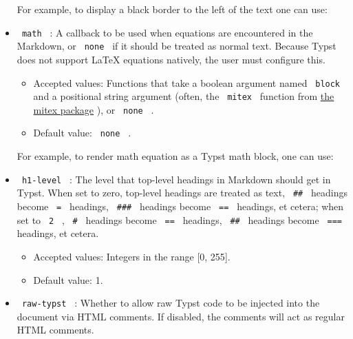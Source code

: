 \begin{itemize}
  For example, to display a black border to the left of the text one can
  use:

\begin{Shaded}
\begin{Highlighting}[]
\end{Highlighting}
\end{Shaded}
\item
  \texttt{\ math\ } : A callback to be used when equations are
  encountered in the Markdown, or \texttt{\ none\ } if it should be
  treated as normal text. Because Typst does not support LaTeX equations
  natively, the user must configure this.

  \begin{itemize}
  \tightlist
  \item
    Accepted values: Functions that take a boolean argument named
    \texttt{\ block\ } and a positional string argument (often, the
    \texttt{\ mitex\ } function from
    \href{https://typst.app/universe/package/mitex}{the mitex package}
    ), or \texttt{\ none\ } .
  \item
    Default value: \texttt{\ none\ } .
  \end{itemize}

  For example, to render math equation as a Typst math block, one can
  use:

\begin{Shaded}
\begin{Highlighting}[]
\end{Highlighting}
\end{Shaded}
\item
  \texttt{\ h1-level\ } : The level that top-level headings in Markdown
  should get in Typst. When set to zero, top-level headings are treated
  as text, \texttt{\ \#\#\ } headings become \texttt{\ =\ } headings,
  \texttt{\ \#\#\#\ } headings become \texttt{\ ==\ } headings, et
  cetera; when set to \texttt{\ 2\ } , \texttt{\ \#\ } headings become
  \texttt{\ ==\ } headings, \texttt{\ \#\#\ } headings become
  \texttt{\ ===\ } headings, et cetera.

  \begin{itemize}
  \tightlist
  \item
    Accepted values: Integers in the range {[}0, 255{]}.
  \item
    Default value: 1.
  \end{itemize}
\item
  \texttt{\ raw-typst\ } : Whether to allow raw Typst code to be
  injected into the document via HTML comments. If disabled, the
  comments will act as regular HTML comments.


\end{itemize}
